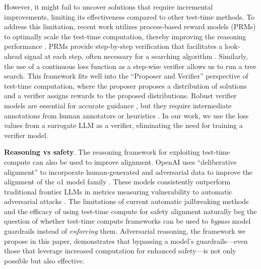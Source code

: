 However, it might fail to uncover solutions that require incremental improvements, limiting its effectiveness compared to other test-time methods. 
To address this limitation, recent work utilizes process-based reward models (PRMs) \cite{uesato2022solvingmathwordproblems,lightman2023letsverifystepstep,wang2024mathshepherdverifyreinforcellms} to optimally scale the test-time computation, thereby improving the reasoning performance \cite{snell2024scalingllmtesttimecompute,xie2024montecarlotreesearch,gandhi2024streamsearchsoslearning,openai2024learning}. 
PRMs provide step-by-step verification that facilitates a look-ahead signal at each step, often necessary for a searching algorithm \cite{xie2024montecarlotreesearch}. 
Similarly, the use of a continuous loss function as a step-wise verifier allows us to run a tree search. 
This framework fits well into the ``Proposer and Verifier'' perspective \cite{snell2024scalingllmtesttimecompute} of test-time computation, where the proposer proposes a distribution of solutions and a verifier assigns rewards to the proposed distributions.  
Robust verifier models are essential for accurate guidance \cite{zhang2024smalllanguagemodelsneed, zhang2024generativeverifiersrewardmodeling, stechly2024selfverificationlimitationslargelanguage}, but they require intermediate annotations from human annotators or heuristics \cite{uesato2022solvingmathwordproblems, lightman2023letsverifystepstep, wang2024mathshepherdverifyreinforcellms}. 
In our work, we use the loss values from a surrogate LLM as a verifier, eliminating the need for training a verifier model. 





\noindent \textbf{Reasoning vs safety}. The reasoning framework for exploiting test-time compute can also be used to improve alignment.
OpenAI uses ``deliberative alignment'' \cite{Guan2024-sv} to incorporate human-generated and adversarial data to improve the alignment of the o1 model family \cite{openai_system_card_2024, openai2024learning}.
These models consistently outperform traditional frontier LLMs in metrics measuring vulnerability to automatic adversarial attacks \cite{openai_system_card_2024, Hughes2024-te}.
The limitations of current automatic jailbreaking methods and the efficacy of using test-time compute for safety alignment naturally beg the question of whether test-time compute frameworks can be used to \textit{bypass} model guardrails instead of \textit{enforcing} them. Adversarial reasoning, the framework we propose in this paper, demonstrates that bypassing a model's guardrails—even those that leverage increased computation for enhanced safety—is not only possible but also effective. 

